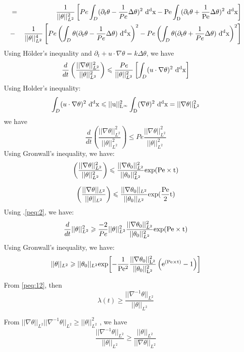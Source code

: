 \documentclass[12pt]{report}   %
\renewcommand{\leq}{\leqslant}
\renewcommand{\geq}{\geqslant}
\numberwithin{equation}{section}
\theoremstyle{plain}
\theoremstyle{definition}
\theoremstyle{remark}
\begin{document}
 \begin{eqnarray*}
 & =& \frac{1}{||\theta||_{L^2}^2}\left[ Pe\int_D(\partial_t\theta-\frac{1}{Pe}\Delta\theta)^2 ~\rm{d}^dx - Pe\int_D(\partial_t\theta +\frac{1}{Pe}\Delta\theta)^2 ~\rm{d}^dx \right] \\
  &-&\frac{1}{||\theta||_{L^2}^4}\left[ Pe\left(  \int_D\theta(\partial_t\theta - \frac{1}{Pe}\Delta\theta) ~\rm{d}^dx \right)^2 - Pe\left( \int_D\theta(\partial_t\theta  +  \frac{1}{Pe}\Delta\theta) ~\rm{d}^dx \right)^2 \right]
 \end{eqnarray*}
 Using H\"{o}lder's inequality and $\partial_t +u\cdot\nabla\theta = k\Delta\theta$, we have 
 \[\frac{d}{dt}\left(\frac{||\nabla\theta||_{L^2}^2}{||\theta||_{L^2}^2}\right) \leq \frac{Pe}{||\theta||_{L^2}^2}\left[ \int_D(u\cdot\nabla\theta)^2 ~\rm{d}^dx \right]
\]
Using Holder's inequality:
\[\int_D (u\cdot\nabla\theta)^2 ~\rm{d}^dx \leq ||u||_{L^\infty}^2\int_D(\nabla\theta)^2 ~\rm{d}^dx = ||\nabla\theta||_{L^2}^2 \]
we have 
\begin{equation}
\frac{d}{dt}\left( \frac{||\nabla\theta||_{L^2}^2}{||\theta||_{L^2}^2}\right) \leq Pe\frac{||\nabla\theta||_{L^2}^2}{||\theta||_{L^2}^2}
\end{equation}
Using Gronwall's inequality, we have:
\[\left( \frac{||\nabla\theta||_{L^2}^2}{||\theta||_{L^2}^2}   \right)  \leq \frac{||\nabla\theta_0||_{L^2}^2}{||\theta_0||_{L^2}^2}\rm{exp}(Pe\times t) \]

\begin{equation}
\left( \frac{||\nabla\theta||_{L^2}}{||\theta||_{L^2}}   \right)  \leq \frac{||\nabla\theta_0||_{L^2}}{||\theta_0||_{L^2}} \rm{exp}{(\frac{Pe}{2} t)}
\end{equation}
Using .\eqref{peq:2}, we have: 
\[ \frac{d}{dt}||\theta||_{L^2}^2 \geq \frac{-2}{Pe}||\theta||_{L^2}^2 \frac{||\nabla\theta_0||_{L^2}^2}{||\theta_0||_{L^2}^2} \rm{exp}{(Pe\times t)} \]
Using Gronwall's inequality, we have:
\begin{equation} ||\theta||_{L^2} \geq ||\theta_0||_{L^2} \rm{exp}{\left[ -\frac{1}{Pe^2} \frac{||\nabla\theta_0||_{L^2}^2}{||\theta_0||_{L^2}^2}\left(e^{(Pe\times t) }- 1\right) \right]} \label{peq:16}
\end{equation}

From \eqref{peq:12}, then
\begin{equation}
\lambda(t) \geq \frac{||\nabla^{-1}\theta||_{L^2}}{||\theta||_{L^2}} \label{peq:13}
\end{equation}

From $||\nabla\theta||_{L^2} ||\nabla^{-1}\theta||_{L^2} \geq ||\theta||_{L^2}^2$ , we have
\[\frac{||\nabla^{-1}\theta||_{L^2}}{||\theta||_{L^2}} \geq \frac{||\theta||_{L^2}}{||\nabla\theta||_{L^2}}\]
\end{document}
